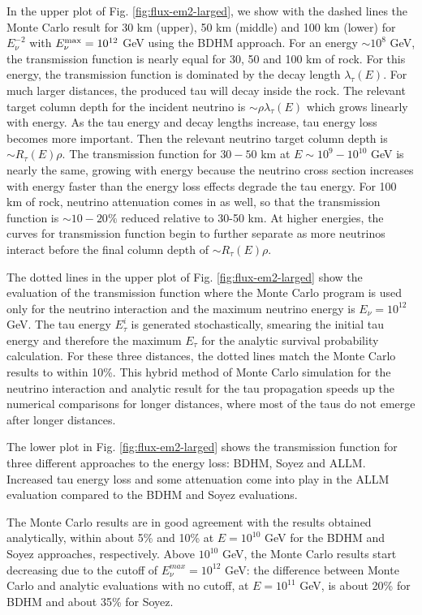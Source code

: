\documentclass[aps,10pt,twocolumn,tightenlines]{revtex4-1}
\begin{document}
In the upper plot of Fig. \ref{fig:flux-em2-larged}, we show with the dashed lines the Monte Carlo result for 30 km (upper), 50 km (middle) and 100 km (lower) for $E_\nu^{-2}$ with
$E_\nu^{\rm max} = 10^{12}$ GeV using the BDHM approach.  For an energy $\sim 10^8$ GeV, the transmission function is nearly equal for 30, 50 and 100 km of rock. For this energy, the transmission function is dominated by the decay length $\lambda_\tau(E)$. For much larger distances, the produced tau will decay inside the rock.
The relevant 
target column depth for the incident neutrino is $\sim \rho\lambda_\tau(E)$ which
grows linearly with energy. As the tau energy and decay lengths increase, tau energy loss becomes more important. Then the relevant neutrino target column depth
is $\sim R_\tau(E)\rho$. The transmission function for $30-50$ km at $E\sim 10^9-10^{10}$ GeV is nearly the same, growing with energy because the neutrino cross section increases with energy faster than the energy loss effects degrade the tau energy. For 100 km of rock, 
neutrino attenuation comes in as well, so that the transmission function is  $\sim 10-20\% $ reduced relative to 30-50 km. At higher energies, the curves for 
transmission function begin to further separate
as more neutrinos interact before the final column depth of $\sim R_\tau(E)\rho$. 

The dotted lines in the upper plot of Fig. \ref{fig:flux-em2-larged} show the evaluation of the transmission function where the Monte Carlo program is used only for the neutrino interaction and the maximum neutrino energy is $E_\nu=10^{12}$ GeV. The tau energy $E_\tau^i$ is generated stochastically, smearing the initial tau energy and therefore the maximum $E_\tau$ for the analytic survival probability calculation. For these three distances, the dotted lines match the Monte Carlo results to within 10\%. 
This hybrid method of Monte Carlo simulation for the neutrino interaction and analytic result for the tau propagation
speeds up the numerical comparisons for longer distances, where most of the taus do not emerge after longer distances.

The lower plot in Fig. \ref{fig:flux-em2-larged} shows the transmission function for three different approaches to the energy loss: BDHM, Soyez and ALLM. Increased tau energy loss and some attenuation come into play in the ALLM evaluation compared to the BDHM and Soyez
evaluations.

The Monte Carlo results are in good agreement with the results obtained 
analytically, 
within about 5\% and 10\% at $E=10^{10}$ GeV for the BDHM and Soyez approaches, respectively.  
Above $10^{10}$ GeV, the Monte Carlo results start decreasing due to the cutoff of $E_\nu^{max}=10^{12}$ GeV:
the difference between Monte Carlo and analytic evaluations with no cutoff, at $E=10^{11}$ GeV, 
is about 20\% for BDHM and  about 35\% for Soyez.
\end{document}
